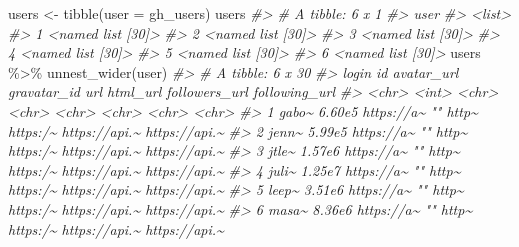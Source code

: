 \documentclass[
]{book}
\newenvironment{Shaded}{\begin{snugshade}}{\end{snugshade}}
\newcommand{\AttributeTok}[1]{\textcolor[rgb]{0.77,0.63,0.00}{#1}}
\newcommand{\CommentTok}[1]{\textcolor[rgb]{0.56,0.35,0.01}{\textit{#1}}}
\newcommand{\FunctionTok}[1]{\textcolor[rgb]{0.00,0.00,0.00}{#1}}
\newcommand{\NormalTok}[1]{#1}
\newcommand{\OtherTok}[1]{\textcolor[rgb]{0.56,0.35,0.01}{#1}}
\newcommand{\SpecialCharTok}[1]{\textcolor[rgb]{0.00,0.00,0.00}{#1}}
\begin{document}
\begin{Shaded}
\begin{Highlighting}[]
\NormalTok{users }\OtherTok{\textless{}{-}} \FunctionTok{tibble}\NormalTok{(}\AttributeTok{user =}\NormalTok{ gh\_users)}
\NormalTok{users}
\CommentTok{\#\textgreater{} \# A tibble: 6 x 1}
\CommentTok{\#\textgreater{}   user             }
\CommentTok{\#\textgreater{}   \textless{}list\textgreater{}           }
\CommentTok{\#\textgreater{} 1 \textless{}named list [30]\textgreater{}}
\CommentTok{\#\textgreater{} 2 \textless{}named list [30]\textgreater{}}
\CommentTok{\#\textgreater{} 3 \textless{}named list [30]\textgreater{}}
\CommentTok{\#\textgreater{} 4 \textless{}named list [30]\textgreater{}}
\CommentTok{\#\textgreater{} 5 \textless{}named list [30]\textgreater{}}
\CommentTok{\#\textgreater{} 6 \textless{}named list [30]\textgreater{}}
\NormalTok{users }\SpecialCharTok{\%\textgreater{}\%} \FunctionTok{unnest\_wider}\NormalTok{(user)}
\CommentTok{\#\textgreater{} \# A tibble: 6 x 30}
\CommentTok{\#\textgreater{}   login     id avatar\_url gravatar\_id url   html\_url followers\_url following\_url}
\CommentTok{\#\textgreater{}   \textless{}chr\textgreater{}  \textless{}int\textgreater{} \textless{}chr\textgreater{}      \textless{}chr\textgreater{}       \textless{}chr\textgreater{} \textless{}chr\textgreater{}    \textless{}chr\textgreater{}         \textless{}chr\textgreater{}        }
\CommentTok{\#\textgreater{} 1 gabo\textasciitilde{} 6.60e5 https://a\textasciitilde{} ""          http\textasciitilde{} https:/\textasciitilde{} https://api.\textasciitilde{} https://api.\textasciitilde{}}
\CommentTok{\#\textgreater{} 2 jenn\textasciitilde{} 5.99e5 https://a\textasciitilde{} ""          http\textasciitilde{} https:/\textasciitilde{} https://api.\textasciitilde{} https://api.\textasciitilde{}}
\CommentTok{\#\textgreater{} 3 jtle\textasciitilde{} 1.57e6 https://a\textasciitilde{} ""          http\textasciitilde{} https:/\textasciitilde{} https://api.\textasciitilde{} https://api.\textasciitilde{}}
\CommentTok{\#\textgreater{} 4 juli\textasciitilde{} 1.25e7 https://a\textasciitilde{} ""          http\textasciitilde{} https:/\textasciitilde{} https://api.\textasciitilde{} https://api.\textasciitilde{}}
\CommentTok{\#\textgreater{} 5 leep\textasciitilde{} 3.51e6 https://a\textasciitilde{} ""          http\textasciitilde{} https:/\textasciitilde{} https://api.\textasciitilde{} https://api.\textasciitilde{}}
\CommentTok{\#\textgreater{} 6 masa\textasciitilde{} 8.36e6 https://a\textasciitilde{} ""          http\textasciitilde{} https:/\textasciitilde{} https://api.\textasciitilde{} https://api.\textasciitilde{}}

\end{Highlighting}
\end{Shaded}
\end{document}
